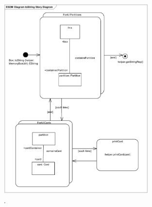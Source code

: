 \begin{figure}[htp]
\begin{center}
  \includegraphics[width=0.7\textwidth]{pics/sdmBilder/toString/sdm76}
  \caption{.}  
  \label{fig:sdm_invert_}
\end{center}
\end{figure}

\clearpage 